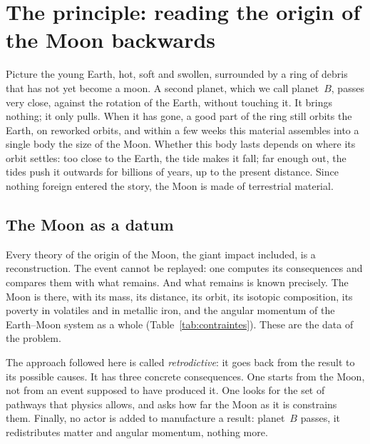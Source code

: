 \documentclass[11pt,a4paper]{article}
\begin{document}
\section{The principle: reading the origin of the Moon backwards}
\label{sec:principe}

\begin{simple}
Picture the young Earth, hot, soft and swollen, surrounded by a ring of debris that has not yet become a moon. A second planet, which we call planet~$B$, passes very close, against the rotation of the Earth, without touching it. It brings nothing; it only pulls. When it has gone, a good part of the ring still orbits the Earth, on reworked orbits, and within a few weeks this material assembles into a single body the size of the Moon. Whether this body lasts depends on where its orbit settles: too close to the Earth, the tide makes it fall; far enough out, the tides push it outwards for billions of years, up to the present distance. Since nothing foreign entered the story, the Moon is made of terrestrial material.
\end{simple}

\subsection{The Moon as a datum}

Every theory of the origin of the Moon, the giant impact included, is a reconstruction. The event cannot be replayed: one computes its consequences and compares them with what remains. And what remains is known precisely. The Moon is there, with its mass, its distance, its orbit, its isotopic composition, its poverty in volatiles and in metallic iron, and the angular momentum of the Earth--Moon system as a whole (Table~\ref{tab:contraintes}). These are the data of the problem.

The approach followed here is called \emph{retrodictive}: it goes back from the result to its possible causes. It has three concrete consequences. One starts from the Moon, not from an event supposed to have produced it. One looks for the set of pathways that physics allows, and asks how far the Moon as it is constrains them. Finally, no actor is added to manufacture a result: planet~$B$ passes, it redistributes matter and angular momentum, nothing more.
\end{document}
